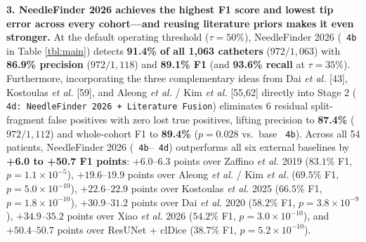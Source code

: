 \documentclass[
  11pt,
]{article}
\let\nforigtexttt\texttt
\renewcommand{\texttt}[1]{\nforigtexttt{\XeTeXinterchartokenstate=1 #1}}
\begin{document}
\textbf{3. NeedleFinder 2026 achieves the highest F1 score and lowest
tip error across every cohort---and reusing literature priors makes it
even stronger.} At the default operating threshold (\(\tau = 50\%\)),
NeedleFinder 2026 (\texttt{4b} in Table \ref{tbl:main}) detects
\textbf{91.4\% of all 1,063 catheters} (\(972/1,063\)) with
\textbf{86.9\% precision} (\(972/1,118\)) and \textbf{89.1\% F1} (and
\textbf{93.6\% recall} at \(\tau = 35\%\)). Furthermore, incorporating
the three complementary ideas from Dai \emph{et al.} {[}43{]}, Kostoulas
\emph{et al.} {[}59{]}, and Aleong \emph{et al.} / Kim \emph{et al.}
{[}55,62{]} directly into Stage 2
(\texttt{4d:\ NeedleFinder\ 2026\ +\ Literature\ Fusion}) eliminates 6
residual split-fragment false positives with zero lost true positives,
lifting precision to \textbf{87.4\%} (\(972/1,112\)) and whole-cohort F1
to \textbf{89.4\%} (\(p = 0.028\) vs.~base \texttt{4b}). Across all 54
patients, NeedleFinder 2026 (\texttt{4b}--\texttt{4d}) outperforms all
six external baselines by \textbf{+6.0 to +50.7 F1 points}:
\(+6.0\text{--}6.3\) points over Zaffino \emph{et al.} 2019 (\(83.1\%\)
F1, \(p = 1.1 \times 10^{-5}\)), \(+19.6\text{--}19.9\) points over
Aleong \emph{et al.} / Kim \emph{et al.} (\(69.5\%\) F1,
\(p = 5.0 \times 10^{-10}\)), \(+22.6\text{--}22.9\) points over
Kostoulas \emph{et al.} 2025 (\(66.5\%\) F1,
\(p = 1.8 \times 10^{-10}\)), \(+30.9\text{--}31.2\) points over Dai
\emph{et al.} 2020 (\(58.2\%\) F1, \(p = 3.8 \times 10^{-9}\)),
\(+34.9\text{--}35.2\) points over Xiao \emph{et al.} 2026 (\(54.2\%\)
F1, \(p = 3.0 \times 10^{-10}\)), and \(+50.4\text{--}50.7\) points over
ResUNet + clDice (\(38.7\%\) F1, \(p = 5.2 \times 10^{-10}\)).
\end{document}
